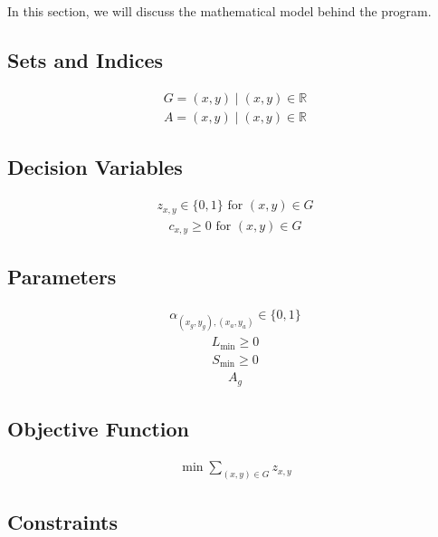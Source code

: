 \documentclass{article}
\begin{document}
In this section, we will discuss the mathematical model behind the program.

\subsection{Sets and Indices}

\begin{align}
    G = (x, y) \mid (x, y) \in \mathbb{R}
\end{align}
\begin{align}
    A = (x, y) \mid (x, y) \in \mathbb{R}
\end{align}

\subsection{Decision Variables}

\begin{align}
    z_{x, y} \in \{0, 1\} \text{ for } (x, y) \in G
\end{align}
\begin{align}
    c_{x, y} \geq 0 \text{ for } (x, y) \in G
\end{align}

\subsection{Parameters}

\begin{align}
    \alpha_{(x_g, y_g), (x_a, y_a)} \in \{0, 1\}
\end{align}
\begin{align}
    L_{\min} \geq 0
\end{align}
\begin{align}
        S_{\min} \geq 0
\end{align}
\begin{align}
    A_g
\end{align}

\subsection{Objective Function}

\begin{align}
    \min \sum_{(x, y) \in G} z_{x, y}
\end{align}

\subsection{Constraints}
\end{document}
